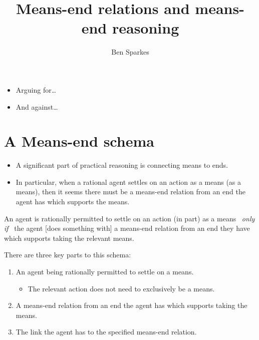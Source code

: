 \documentclass[10pt]{article}
\title{Means-end relations and means-end reasoning}
\author{Ben Sparkes}
\newenvironment{beamerblock}[1]{%
  \tcolorbox[standard,%
  no shadow,
  noparskip,
  colback=white,
  colframe=black,
  colbacktitle=white,
  coltitle=black,
  colupper=black,
  size=small,
  boxrule=.125mm,
  fonttitle=\bfseries,
  sharp corners=all,
  title=#1]}%
{\endtcolorbox}
\newcommand{\hozlinedash}[0]{%
  \noindent\hdashrule[0.5ex][c]{\textwidth}{.1pt}{2.5pt}
}
\begin{document}

\maketitle

\tableofcontents


\hozlinedash

\begin{itemize}
\item Arguing for\dots
\item And against\dots
\end{itemize}

\hozlinedash


\newpage

\section{A Means-end schema}
\label{sec:means-end-schema}


\begin{itemize}
\item A significant part of practical reasoning is connecting means to ends.
\item In particular, when a rational agent settles on an action as a means (as a means), then it seems there must be a means-end relation from an end the agent has which supports the means.
\end{itemize}

\begin{beamerblock}{Means-end schema}
  An agent is rationally permitted to settle on an action (in part) as a means
  \newline
  \mbox{ }\hfill\emph{only if}\hfill\mbox{ }
  \newline
  the agent [{does something with}] a means-end relation from an end they have which supports taking the relevant means.
\end{beamerblock}

There are three key parts to this schema:
\begin{enumerate}[label=\arabic*., ref=(\arabic*)]
\item An agent being rationally permitted to settle on a means.
  \begin{itemize}
  \item The relevant action does not need to exclusively be a means.
  \end{itemize}
\item A means-end relation from an end the agent has which supports taking the means.
\item The link the agent has to the specified means-end relation.
\end{enumerate}
\end{document}
